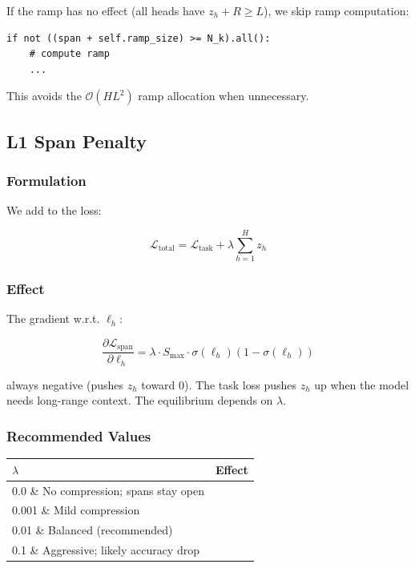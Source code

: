 If the ramp has no effect (all heads have $z_h + R \geq L$), we skip ramp 
computation:

\begin{lstlisting}
if not ((span + self.ramp_size) >= N_k).all():
    # compute ramp
    ...
\end{lstlisting}

This avoids the $\mathcal{O}(H L^2)$ ramp allocation when unnecessary.

\subsection{L1 Span Penalty}

\subsubsection{Formulation}

We add to the loss:

\[
\mathcal{L}_\text{total} = \mathcal{L}_\text{task} + \lambda \sum_{h=1}^H z_h
\]

\subsubsection{Effect}

The gradient w.r.t. $\ell_h$:

\[
\frac{\partial \mathcal{L}_\text{span}}{\partial \ell_h} = \lambda \cdot S_\text{max} \cdot \sigma(\ell_h)(1 - \sigma(\ell_h))
\]

always negative (pushes $z_h$ toward 0). The task loss pushes $z_h$ up 
when the model needs long-range context. The equilibrium depends on 
$\lambda$.

\subsubsection{Recommended Values}

\begin{table}[H]
\centering
\small
\begin{tabular}{ll}
\toprule
\textbf{$\lambda$} & \textbf{Effect} \\
\midrule
0.0 \& No compression; spans stay open \\
0.001 \& Mild compression \\
0.01 \& Balanced (recommended) \\
0.1 \& Aggressive; likely accuracy drop \\
\bottomrule
\end{tabular}
\end{table}

